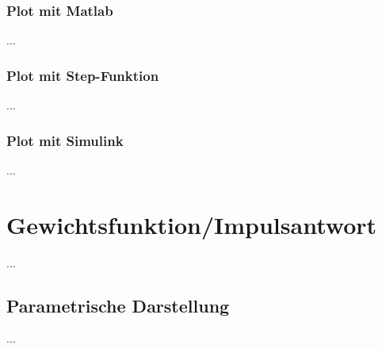 \documentclass[
  ngerman
  ,12pt
  ,pdftex
]{article}
\begin{document}
\subsubsection{Plot mit Matlab}
        
%
                    
...
\subsubsection{Plot mit Step-Funktion}
...
\subsubsection{Plot mit Simulink}
...

\section{Gewichtsfunktion/Impulsantwort} %
...
\subsection{Parametrische Darstellung} %
...
\end{document}
